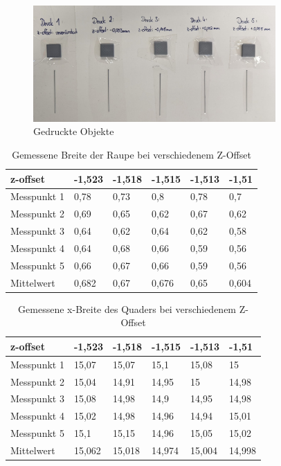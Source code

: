 \documentclass[a4paper,12pt,bibtotocnumbered]{scrartcl}
\numberwithin{equation}{section} %
\begin{document}
\begin{figure}[H]
\centerline{\includegraphics[width=350px]{./images/scan.png}}
\caption{Gedruckte Objekte}
\label{fig:scan}
\end{figure}



\begin{table}[H]
\centering
\begin{tabular}{|l|l|l|l|l|l|}
\hline
z-offset    & -1,523 & -1,518 & -1,515 & -1,513 & -1,51 \\ \hline
Messpunkt 1 & 0,78   & 0,73   & 0,8    & 0,78   & 0,7   \\ \hline
Messpunkt 2 & 0,69   & 0,65   & 0,62   & 0,67   & 0,62  \\ \hline
Messpunkt 3 & 0,64   & 0,62   & 0,64   & 0,62   & 0,58  \\ \hline
Messpunkt 4 & 0,64   & 0,68   & 0,66   & 0,59   & 0,56  \\ \hline
Messpunkt 5 & 0,66   & 0,67   & 0,66   & 0,59   & 0,56  \\ \hline
Mittelwert  & 0,682  & 0,67   & 0,676  & 0,65   & 0,604 \\ \hline
\end{tabular}
\caption{Gemessene Breite der Raupe bei verschiedenem Z-Offset}
\label{tab:raupe}
\end{table}


\begin{table}[H]
\centering
\begin{tabular}{|l|l|l|l|l|l|}
\hline
z-offset    & -1,523 & -1,518 & -1,515 & -1,513 & -1,51  \\ \hline
Messpunkt 1 & 15,07  & 15,07  & 15,1   & 15,08  & 15     \\ \hline
Messpunkt 2 & 15,04  & 14,91  & 14,95  & 15     & 14,98  \\ \hline
Messpunkt 3 & 15,08  & 14,98  & 14,9   & 14,95  & 14,98  \\ \hline
Messpunkt 4 & 15,02  & 14,98  & 14,96  & 14,94  & 15,01  \\ \hline
Messpunkt 5 & 15,1   & 15,15  & 14,96  & 15,05  & 15,02  \\ \hline
Mittelwert  & 15,062 & 15,018 & 14,974 & 15,004 & 14,998 \\ \hline
\end{tabular}
\caption{Gemessene x-Breite des Quaders bei verschiedenem Z-Offset}
\label{tab:x-achse}
\end{table}
\end{document}
